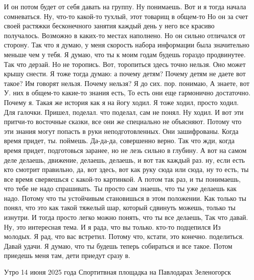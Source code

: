И он потом будет от себя давать на группу.
Ну понимаешь.
Вот и я тогда начала сомневаться.
Ну, что-то какой-то тухлый, этот товарищ в общем-то
Но он за счет своей растяжки бесконечного занятия каждый день у него все красиво получалось.
Возможно в каких-то местах наполнено.
Но он сильно отличался от сторону.
Так что я думаю, у меня скорость набора информации была значительно меньше чем у тебя.
Я думаю, что ты к моим годам будешь гораздо продвинутее.
Так что дерзай.
Но не торопись.
Вот, торопиться здесь точно нельзя.
Оно может крышу снести.
Я тоже тогда думаю: а почему детям?
Почему детям не даете вот такое?
Им говорят нельзя.
Почему нельзя?
Я до сих. пор.
понимаю, А знаете, вот У.
них в общем-то какие-то знания есть, То есть они еще гармонично достаточно.
Почему я.
Такая же история как я на йогу ходил.
Я тоже ходил, просто ходил.
Для галочки.
Пришел, поделал. что поделал, сам не понял.
Ну ходил.
И вот эти притчи-то восточные сказки, все они же специально не объясняют.
Потому что эти знания могут попасть в руки неподготовленных.
Они зашифрованы.
Когда время придет, ты.
поймешь.
Да-да-да, совершенно верно.
Так что жди, когда время придет, подготовься заранее, но не лезь сильно в глубину.
А вот на самом деле делаешь, движение, делаешь, делаешь, и вот так каждый раз. ну, если есть кто смотрит правильно, да, вот здесь, вот как руку сюда или сюда, ну то есть, ты все время сверяешься с какой-то картинкой.
А потом так раз, и ты понимаешь, что тебе не надо спрашивать.
Ты просто сам знаешь, что ты уже делаешь как надо.
Потому что ты устойчивым становишься в этом положении.
Как только ты понял, что это как такой тяжелый шар, который сдвинуть можешь, только ты изнутри.
И тогда просто легко можно понять, что ты все делаешь, Так что давай.
Ну, это интересная тема.
И я рада, что вы только.
кто-то подцепился Из молодых. Я рад, что вас встретил.
Потому что, кстати, это конечно.
поделиться. Давай удачи. Я думаю, что ты будешь теперь собираться и все такое. Потом приедешь меня там, дети приедут сразу в.

Утро 14 июня 2025 года
Спортитвная площадка на Павлодарах
Зеленогорск
\bye
